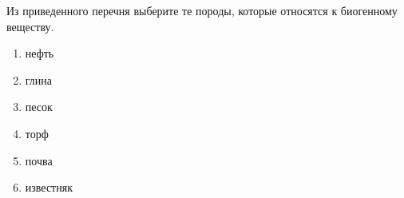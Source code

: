 Из приведенного перечня выберите те породы, которые относятся к биогенному веществу.
\begin{enumerate}
    \item нефть
    \item глина
    \item песок
    \item торф
    \item почва
    \item известняк
\end{enumerate}

